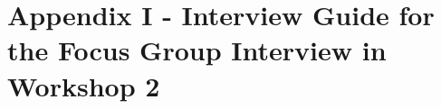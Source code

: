 \section*{Appendix I - Interview Guide for the Focus Group Interview in Workshop 2}
\label{app:interviewGuide2}
\begin{figure}[H] 
\end{figure}

